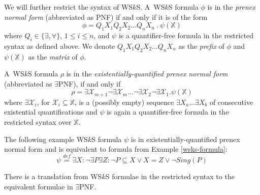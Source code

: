 We will further restrict the syntax of WS$k$S. A~WS$k$S formula $\phi$ is in the
\emph{prenex normal form} (abbreviated as PNF) if and only if it is of the form
\begin{equation}
\phi = Q_1X_1Q_2X_2\ldots Q_nX_n\ .\ \psi(\mathds{X})
\end{equation} where 
$Q_i \in \{\exists,\forall\}$, $1 \leq i \leq n$, and $\psi$ is a quantifier-free formula
in the restricted syntax as defined above. We denote $Q_1X_1Q_2X_2\ldots Q_nX_n$
as the \emph{prefix} of $\phi$ and $\psi(\mathds{X})$ as the \emph{matrix} of
$\phi$.
	
A~WS$k$S formula $\rho$ is in the \emph{existentially-quantified prenex normal
form} (abbreviated as $\exists$PNF), if and only if \begin{equation}\rho =
\exists \mathcal{X}_{m+1}\neg\exists \mathcal{X}_m\ldots\neg\exists
\mathcal{X}_2\neg\exists \mathcal{X}_1.\psi(\mathds{X})
\end{equation} where
$\exists\mathcal{X}_i$, for $\mathcal{X}_i \subseteq \mathds{X}$, is a (possibly
empty) sequence $\exists X_a\ldots\exists X_b$ of consecutive existential
quantifications and $\psi$ is again a quantifier-free formula in the restricted
syntax over $\mathds{X}$.
	
  \noindent\hrulefill
  \begin{example}
  The following example WS$k$S formula $\psi$ is in existentially-quantified prenex normal
form and is equivalent to formula from Example \ref{wsks-formula}:
  \begin{equation}
   \psi \overset{\mathit{def}}{=} \exists X: \neg \exists P \exists Z: \neg P
   \subseteq X \vee X = Z \vee \neg\mathit{Sing}(P)
  \end{equation}
   \hrulefill
  \end{example}\label{wsks-formula-restricted}
	
	\begin{prop}
There is a translation from WS$k$S formulae in the restricted syntax to the
equivalent formulae in $\exists$PNF.
	\end{prop}
	
